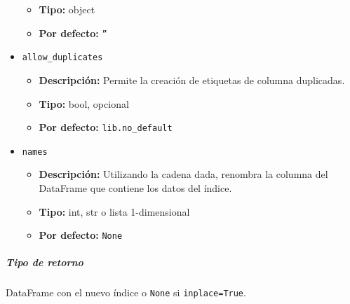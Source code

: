 \begin{itemize}
\begin{itemize}
\item \textbf{Tipo:} object
\item \textbf{Por defecto:} \texttt{''}
\end{itemize}
\item \texttt{allow\_duplicates}
\begin{itemize}
\item \textbf{Descripción:} Permite la creación de etiquetas de columna duplicadas.
\item \textbf{Tipo:} bool, opcional
\item \textbf{Por defecto:} \texttt{lib.no\_default}
\end{itemize}
\item \texttt{names}
\begin{itemize}
\item \textbf{Descripción:} Utilizando la cadena dada, renombra la columna del DataFrame que contiene los datos del índice.
\item \textbf{Tipo:} int, str o lista 1-dimensional
\item \textbf{Por defecto:} \texttt{None}
\end{itemize}
\end{itemize}
\subparagraph{Tipo de retorno}
DataFrame con el nuevo índice o \texttt{None} si \texttt{inplace=True}.

